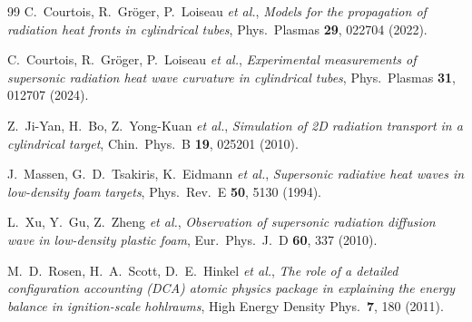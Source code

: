 \documentclass[prl, twocolumn, superscriptaddress, amsmath, amssymb, reprint]{revtex4-2}
\begin{document}
\begin{thebibliography}{99}
C.~Courtois, R.~Gr\"oger, P.~Loiseau \textit{et al.},
\textit{Models for the propagation of radiation heat fronts in cylindrical tubes},
Phys.\ Plasmas \textbf{29}, 022704 (2022).

C.~Courtois, R.~Gr\"oger, P.~Loiseau \textit{et al.},
\textit{Experimental measurements of supersonic radiation heat wave curvature in cylindrical tubes},
Phys.\ Plasmas \textbf{31}, 012707 (2024).

Z.~Ji-Yan, H.~Bo, Z.~Yong-Kuan \textit{et al.},
\textit{Simulation of 2D radiation transport in a cylindrical target},
Chin.\ Phys.\ B \textbf{19}, 025201 (2010).

J.~Massen, G.~D.~Tsakiris, K.~Eidmann \textit{et al.},
\textit{Supersonic radiative heat waves in low-density foam targets},
Phys.\ Rev.\ E \textbf{50}, 5130 (1994).

L.~Xu, Y.~Gu, Z.~Zheng \textit{et al.},
\textit{Observation of supersonic radiation diffusion wave in low-density plastic foam},
Eur.\ Phys.\ J.\ D \textbf{60}, 337 (2010).

M.~D.~Rosen, H.~A.~Scott, D.~E.~Hinkel \textit{et al.},
\textit{The role of a detailed configuration accounting (DCA) atomic physics package in explaining the energy balance in ignition-scale hohlraums},
High Energy Density Phys.\ \textbf{7}, 180 (2011).

\end{thebibliography}
\end{document}
